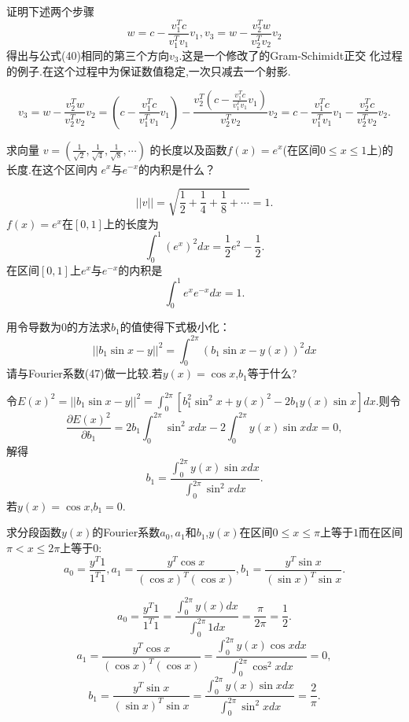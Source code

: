 ﻿\documentclass{book} \usepackage{exsheets} \usepackage{xeCJK}
\begin{document}
\begin{question}
  证明下述两个步骤
$$
w=c-\frac{v_1^Tc}{v_1^Tv_1}v_1,v_3=w-\frac{v_2^Tw}{v_2^Tv_2}v_2
$$
得出与公式(40)相同的第三个方向$v_3$.这是一个修改了的Gram-Schimidt正交
化过程的例子.在这个过程中为保证数值稳定,一次只减去一个射影.
\end{question}
\begin{solution}
  $$ 
v_3=w-\frac{v_2^Tw}{v_2^Tv_2}v_2=\left(c-\frac{v_1^Tc}{v_1^Tv_1}v_1\right)-\frac{v_2^T\left(c-\frac{v_1^Tc}{v_1^Tv_1}v_1\right)}{v_2^Tv_2}v_2=c-\frac{v_1^Tc}{v_1^Tv_1}v_1-\frac{v_2^Tc}{v_2^Tv_2}v_2.
 $$
\end{solution}
\begin{question}
  求向量
  $v=(\frac{1}{\sqrt{2}},\frac{1}{\sqrt{4}},\frac{1}{\sqrt{8}},\cdots)$
  的长度以及函数$f(x)=e^x$(在区间$0\leq x\leq 1$上)的长度.在这个区间内
  $e^x$与$e^{-x}$的内积是什么？
\end{question}
\begin{solution}
  $$ 
||v||=\sqrt{\frac{1}{2}+\frac{1}{4}+\frac{1}{8}+\cdots}=1.
 $$
$f(x)=e^x$在$[0,1]$上的长度为
$$
\int_0^1(e^x)^2dx=\frac{1}{2}e^2-\frac{1}{2}.
$$
在区间$[0,1]$上$e^x$与$e^{-x}$的内积是
$$
\int_0^1e^xe^{-x}dx=1.
$$
\end{solution}
\begin{question}
  用令导数为$0$的方法求$b_1$的值使得下式极小化：
$$
||b_1\sin x-y||^2=\int_0^{2\pi}(b_1\sin x-y(x))^2dx
$$
请与Fourier系数(47)做一比较.若$y(x)=\cos x$,$b_1$等于什么?
\end{question}
\begin{solution}
令$E(x)^2=||b_1\sin
x-y||^2=\int_0^{2\pi}[b_1^2\sin^2x+y(x)^2-2b_1y(x)\sin x]dx$.则令
$$
\frac{\partial E(x)^2}{\partial b_1}=2b_1\int_0^{2\pi}\sin^2x
dx-2\int_0^{2\pi}y(x)\sin xdx=0,
$$
解得
$$
b_1=\frac{\int_0^{2\pi}y(x)\sin xdx}{\int_0^{2\pi}\sin^2xdx}.
$$
若$y(x)=\cos x$,$b_1=0$.
\end{solution}
\begin{question}
  求分段函数$y(x)$的Fourier系数$a_0,a_1$和$b_1$,$y(x)$在区间$0\leq
  x\leq \pi$上等于$1$而在区间$\pi<x\leq 2\pi$上等于$0$:
$$
a_0=\frac{y^T1}{1^T1},a_1=\frac{y^T\cos x}{(\cos x)^T(\cos
  x)},b_1=\frac{y^T\sin x}{(\sin x)^T\sin x}.
$$
\end{question}
\begin{solution}
  $$ 
a_0=\frac{y^T1}{1^T1}=\frac{\int_0^{2\pi}y(x)dx}{\int_0^{2\pi}1dx}=\frac{\pi}{2\pi}=\frac{1}{2}.
 $$
$$
a_1=\frac{y^T\cos x}{(\cos x)^T(\cos x)}=\frac{\int_0^{2\pi}y(x)\cos xdx}{\int_0^{2\pi}\cos^2xdx}=0,
$$
$$
b_1=\frac{y^T\sin x}{(\sin x)^T\sin x}=\frac{\int_0^{2\pi}y(x)\sin xdx}{\int_0^{2\pi}\sin^2xdx}=\frac{2}{\pi}.
$$
\end{solution}
\end{document}
